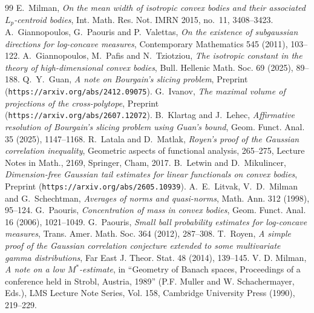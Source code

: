 \documentclass[10pt,a4paper]{amsart}
\numberwithin{equation}{section}
\begin{document}
\begin{thebibliography}{99}
 \textrm{E.\ Milman}, \textit{On the mean width of isotropic convex bodies and their associated $L_p$-centroid bodies}, Int. Math. Res. Not. IMRN 2015, no.~11, 3408--3423.
 \textrm{A.\ Giannopoulos, G.\ Paouris and P.\ Valettas}, \textit{On the existence of subgaussian directions for log-concave measures}, Contemporary Mathematics {545} (2011), 103--122.
 \textrm{A.\ Giannopoulos, M.\ Pafis and N.\ Tziotziou}, \textit{The isotropic constant in the theory of high-dimensional convex bodies}, Bull. Hellenic Math. Soc. 69 (2025), 89--188.
 \textrm{Q.~Y.~Guan}, \textit{A note on Bourgain's slicing problem}, Preprint ({\tt https://arxiv.org/abs/2412.09075}).
 \textrm{G.~Ivanov}, \textit{The maximal volume of projections of the cross-polytope}, Preprint\\ ({\tt https://arxiv.org/abs/2607.12072}).
 \textrm{B.~Klartag and J.~Lehec}, \textit{Affirmative resolution of Bourgain's slicing problem using Guan's bound}, Geom. Funct. Anal. 35 (2025), 1147--1168.
 \textrm{R.\ Latala and D.\ Matlak}, \textit{Royen's proof of the Gaussian correlation inequality}, Geometric aspects of functional analysis, 265--275, Lecture Notes in Math., 2169, Springer, Cham, 2017.
 \textrm{B.~Letwin and D.~Mikulincer}, \textit{Dimension-free Gaussian tail estimates for linear functionals on convex bodies}, Preprint ({\tt https://arxiv.org/abs/2605.10939}).
 \textrm{A.\ E.\ Litvak, V.\ D.\ Milman and G.\ Schechtman}, \textit{Averages of norms and quasi-norms}, Math. Ann. {312} (1998), 95--124.
 \textrm{G.\ Paouris}, \textit{Concentration of mass in convex bodies}, Geom. Funct. Anal. 16 (2006), 1021--1049.
 \textrm{G.\ Paouris}, \textit{Small ball probability estimates for log-concave measures}, Trans. Amer. Math. Soc. {364} (2012), 287--308.
 \textrm{T.\ Royen}, \textit{A simple proof of the Gaussian correlation conjecture extended to some multivariate gamma distributions}, Far East J. Theor. Stat. {48} (2014), 139--145.
 \textrm{V. D. Milman}, \textit{A note on a low $M^{\ast }$-estimate}, in ``Geometry of Banach spaces, Proceedings of a conference held in Strobl, Austria, 1989'' (P.F. Muller and W. Schachermayer, Eds.), LMS Lecture Note Series, Vol. 158, Cambridge University Press (1990), 219--229.
\end{thebibliography}
\end{document}
